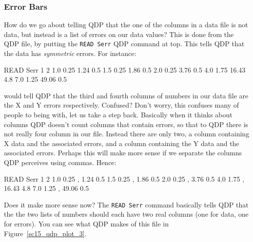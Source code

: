 \documentclass[twoside,11pt]{starlink}
\begin{document}

\subsubsection{Error Bars}

How do we go about telling QDP that the one of the columns in a data
file is not data, but instead is a list of errors on our data values?
This is done from the QDP file, by putting the \texttt{READ Serr} QDP
command at top. This tells QDP that the data has \emph{symmetric}
errors. For instance:

\begin{small}
\begin{terminalv}
READ Serr 1 2
1.0  0.25   1.24  0.5
1.5  0.25   1.86  0.5
2.0  0.25   3.76  0.5
4.0  1.75  16.43  4.8
7.0  1.25  49.06  0.5
\end{terminalv}
\end{small}

would tell QDP that the third and fourth columns of numbers in our
data file are the X and Y errors respectively. Confused? Don't worry,
this confuses many of people to being with, let us take a step back.
Basically when it thinks about columns QDP doesn't count columns that
contain errors, so that to QDP there is not really four column in our
file. Instead there are only two, a column containing X data and the
associated errors, and a column containing the Y data and the
associated errors. Perhaps this will make more sense if we separate
the columns QDP perceives using commas. Hence:

\begin{small}
\begin{terminalv}
READ Serr 1 2
1.0  0.25 ,  1.24  0.5
1.5  0.25 ,  1.86  0.5
2.0  0.25 ,  3.76  0.5
4.0  1.75 , 16.43  4.8
7.0  1.25 , 49.06  0.5
\end{terminalv}
\end{small}

Does it make more sense now? The \texttt{READ Serr} command basically
tells QDP that the the two lists of numbers should each have two real
columns (one for data, one for errors). You can see what QDP makes of
this file in Figure~\ref{sc15_qdp_plot_3}.

\end{document}

